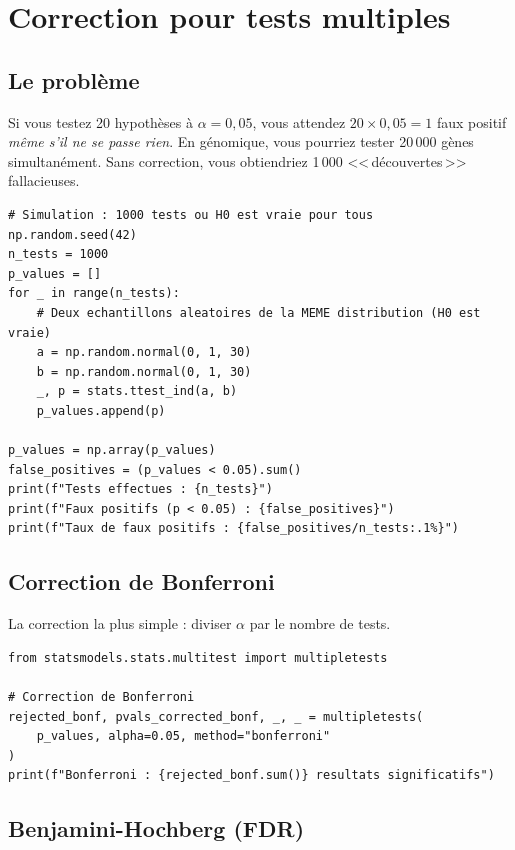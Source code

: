 \section{Correction pour tests multiples}

\subsection{Le probl\`eme}

Si vous testez 20 hypoth\`eses \`a $\alpha = 0{,}05$, vous attendez $20 \times 0{,}05 = 1$ faux positif \emph{m\^eme s'il ne se passe rien}. En g\'enomique, vous pourriez tester 20\,000 g\`enes simultan\'ement. Sans correction, vous obtiendriez 1\,000 <<\,d\'ecouvertes\,>> fallacieuses.

\begin{verbatim}
# Simulation : 1000 tests ou H0 est vraie pour tous
np.random.seed(42)
n_tests = 1000
p_values = []
for _ in range(n_tests):
    # Deux echantillons aleatoires de la MEME distribution (H0 est vraie)
    a = np.random.normal(0, 1, 30)
    b = np.random.normal(0, 1, 30)
    _, p = stats.ttest_ind(a, b)
    p_values.append(p)

p_values = np.array(p_values)
false_positives = (p_values < 0.05).sum()
print(f"Tests effectues : {n_tests}")
print(f"Faux positifs (p < 0.05) : {false_positives}")
print(f"Taux de faux positifs : {false_positives/n_tests:.1%}")
\end{verbatim}

\subsection{Correction de Bonferroni}

La correction la plus simple : diviser $\alpha$ par le nombre de tests.

\begin{verbatim}
from statsmodels.stats.multitest import multipletests

# Correction de Bonferroni
rejected_bonf, pvals_corrected_bonf, _, _ = multipletests(
    p_values, alpha=0.05, method="bonferroni"
)
print(f"Bonferroni : {rejected_bonf.sum()} resultats significatifs")
\end{verbatim}

\subsection{Benjamini-Hochberg (FDR)}

